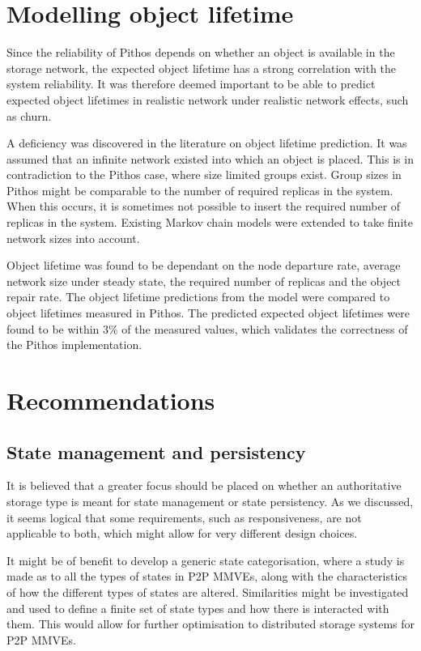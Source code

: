 \section{Modelling object lifetime}

Since the reliability of Pithos depends on whether an object is available in the storage network, the expected object lifetime has a strong correlation with the system reliability. It was therefore deemed important to be able to predict expected object lifetimes in realistic network under realistic network effects, such as churn.

A deficiency was discovered in the literature on object lifetime prediction. It was assumed that an infinite network existed into which an object is placed. This is in contradiction to the Pithos case, where size limited groups exist. Group sizes in Pithos might be comparable to the number of required replicas in the system. When this occurs, it is sometimes not possible to insert the required number of replicas in the system. Existing Markov chain models were extended to take finite network sizes into account.

Object lifetime was found to be dependant on the node departure rate, average network size under steady state, the required number of replicas and the object repair rate. The object lifetime predictions from the model were compared to object lifetimes measured in Pithos. The predicted expected object lifetimes were found to be within 3\% of the measured values, which validates the correctness of the Pithos implementation.

\section{Recommendations}

\subsection{State management and persistency}
It is believed that a greater focus should be placed on whether an authoritative storage type is meant for state management or state persistency. As we discussed, it seems logical that some requirements, such as responsiveness, are not applicable to both, which might allow for very different design choices.

It might be of benefit to develop a generic state categorisation, where a study is made as to all the types of states in P2P MMVEs, along with the characteristics of how the different types of states are altered. Similarities might be investigated and used to define a finite set of state types and how there is interacted with them. This would allow for further optimisation to distributed storage systems for P2P MMVEs.


